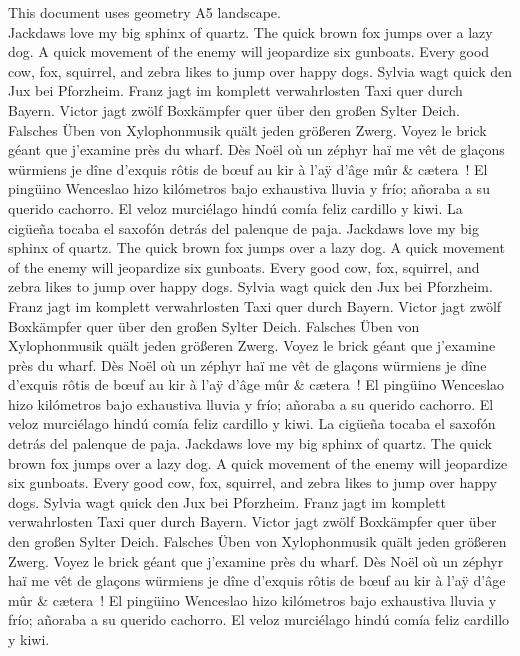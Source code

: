 \documentclass{article}
\begin{document}
This document uses geometry A5 landscape.
\\
Jackdaws love my big sphinx of quartz.
The quick brown fox jumps over a lazy dog.
A quick movement of the enemy will jeopardize six gunboats.
Every good cow, fox, squirrel, and zebra likes to jump over happy dogs.
Sylvia wagt quick den Jux bei Pforzheim.
Franz jagt im komplett verwahrlosten Taxi quer durch Bayern.
Victor jagt zwölf Boxkämpfer quer über den großen Sylter Deich.
Falsches Üben von Xylophonmusik quält jeden größeren Zwerg.
Voyez le brick géant que j'examine près du wharf.
Dès Noël où un zéphyr haï me vêt de glaçons würmiens je dîne d’exquis rôtis de bœuf au kir à l’aÿ d’âge mûr \& cætera~!
El pingüino Wenceslao hizo kilómetros bajo exhaustiva lluvia y frío; añoraba a su querido cachorro.
El veloz murciélago hindú comía feliz cardillo y kiwi. La cigüeña tocaba el saxofón detrás del palenque de paja.
%
Jackdaws love my big sphinx of quartz.
The quick brown fox jumps over a lazy dog.
A quick movement of the enemy will jeopardize six gunboats.
Every good cow, fox, squirrel, and zebra likes to jump over happy dogs.
Sylvia wagt quick den Jux bei Pforzheim.
Franz jagt im komplett verwahrlosten Taxi quer durch Bayern.
Victor jagt zwölf Boxkämpfer quer über den großen Sylter Deich.
Falsches Üben von Xylophonmusik quält jeden größeren Zwerg.
Voyez le brick géant que j'examine près du wharf.
Dès Noël où un zéphyr haï me vêt de glaçons würmiens je dîne d’exquis rôtis de bœuf au kir à l’aÿ d’âge mûr \& cætera~!
El pingüino Wenceslao hizo kilómetros bajo exhaustiva lluvia y frío; añoraba a su querido cachorro.
El veloz murciélago hindú comía feliz cardillo y kiwi. La cigüeña tocaba el saxofón detrás del palenque de paja.
%
Jackdaws love my big sphinx of quartz.
The quick brown fox jumps over a lazy dog.
A quick movement of the enemy will jeopardize six gunboats.
Every good cow, fox, squirrel, and zebra likes to jump over happy dogs.
Sylvia wagt quick den Jux bei Pforzheim.
Franz jagt im komplett verwahrlosten Taxi quer durch Bayern.
Victor jagt zwölf Boxkämpfer quer über den großen Sylter Deich.
Falsches Üben von Xylophonmusik quält jeden größeren Zwerg.
Voyez le brick géant que j'examine près du wharf.
Dès Noël où un zéphyr haï me vêt de glaçons würmiens je dîne d’exquis rôtis de bœuf au kir à l’aÿ d’âge mûr \& cætera~!
El pingüino Wenceslao hizo kilómetros bajo exhaustiva lluvia y frío; añoraba a su querido cachorro.
El veloz murciélago hindú comía feliz cardillo y kiwi.
\end{document}
